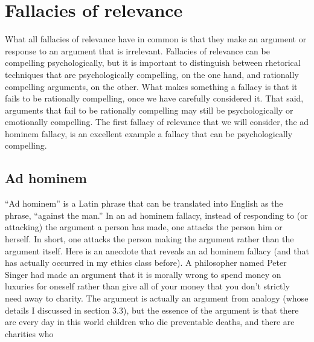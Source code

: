 \section{Fallacies of relevance}
What all fallacies of relevance have in common is that they make an argument or
response to an argument that is irrelevant. Fallacies of relevance can be
compelling psychologically, but it is important to distinguish between rhetorical
techniques that are psychologically compelling, on the one hand, and rationally
compelling arguments, on the other. What makes something a fallacy is that it
fails to be rationally compelling, once we have carefully considered it. That said,
arguments that fail to be rationally compelling may still be psychologically or
emotionally compelling. The first fallacy of relevance that we will consider, the
ad hominem fallacy, is an excellent example a fallacy that can be psychologically
compelling.

\subsection{Ad hominem}

``Ad hominem'' is a Latin phrase that can be translated into English as the phrase, ``against the man.'' In an ad hominem fallacy, instead of responding to (or attacking) the argument a person has made, one attacks the person him or herself. In short, one attacks the person making the argument rather than the argument itself. Here is an anecdote that reveals an ad hominem fallacy (and that has actually occurred in my ethics class before). A philosopher named Peter Singer had made an argument that it is
morally wrong to spend money on luxuries for oneself rather than give all
of your money that you don't strictly need away to charity. The argument
is actually an argument from analogy (whose details I discussed in section
3.3), but the essence of the argument is that there are every day in this
world children who die preventable deaths, and there are charities who

